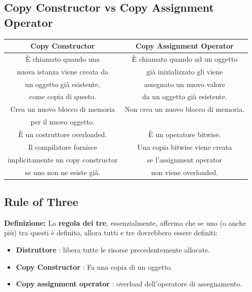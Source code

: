 \subsection{Copy Constructor vs Copy Assignment Operator}

\begin{tabular}{|c|c|}
	\hline
	\textbf{Copy Constructor} & \textbf{Copy Assignment Operator} \\
	\hline
	\textsf{\small È chiamato quando una } & \textsf{\small È chiamato quando ad un oggetto } \\
	\textsf{\small nuova istanza viene creata da } & \textsf{\small già inizializzato gli viene } \\
	\textsf{\small un oggetto già esistente, } & \textsf{\small assegnato un nuovo valore } \\
	\textsf{\small come copia di questo.} & \textsf{\small da un oggetto già esistente.} \\
	\hline
	\textsf{\small Crea un nuovo blocco di memoria} & \textsf{\small Non crea un nuovo blocco di memoria.} \\
	\textsf{\small per il nuovo oggetto.} & \textsf{\small } \\
	\hline
	\textsf{\small È un costruttore overloaded.} & \textsf{\small È un operatore bitwise.} \\
	\hline
	\textsf{\small Il compilatore fornisce} & \textsf{\small Una copia bitwise viene creata} \\
	\textsf{\small implicitamente un copy constructor} & \textsf{\small se l'assignment operator} \\
	\textsf{\small se uno non ne esiste già.} & \textsf{\small non viene overloaded.} \\
	\hline
\end{tabular}

\subsection{Rule of Three}

\textsf{\small \textbf{Definizione: } La \textbf{regola dei tre}, essenzialmente, afferma che se uno (o anche più) tra questi è definito, allora tutti e tre dovrebbero essere definiti: } \\

\begin{itemize}
	\item \textsf{\small \textbf{Distruttore} : libera tutte le risorse precedentemente allocate.}
	\item \textsf{\small \textbf{Copy Constructor} : Fa una copia di un oggetto.}
	\item \textsf{\small \textbf{Copy assignment operator} : overload dell'operatore di assegnamento.}
\end{itemize}

